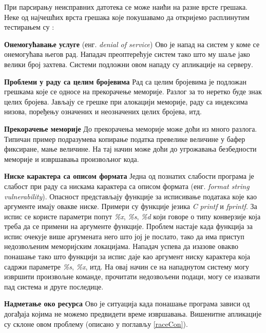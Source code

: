 \documentclass[12pt,oneside]{memoir}
\begin{document}
При парсирању неисправних датотека се може наићи на разне врсте грешака. Неке од најчешћих врста грешака које покушавамо да откријемо расплинутим тестирањем су \cite{fuzzingBrute, fuzzing}:
\begin{description}
\item \textbf{Онемогућавање услуге} (енг. \textit{denial of service}) Ово је напад на систем у коме се онемогућава његов рад. Нападач преоптерећује систем тако што му шаље јако велики број захтева. Системи подложни овом нападу су апликације на серверу.   
\item \textbf{Проблеми у раду са целим бројевима} Рад са целим бројевима је подложан грешкама које се односе на прекорачење меморије. Разлог за то неретко буде знак целих бројева. Јављају се грешке при алокацији меморије, раду са индексима низова, поређењу означених и неозначених целих бројева, итд.
\item \textbf{Прекорачење меморије} До прекорачења меморије може доћи из много разлога. Типичан пример подразумева копирање податка превелике величине у бафер фиксиране, мање величине. На тај начин може доћи до угрожавања безбедности меморије и извршавања произвољног кода.
\item \textbf{Ниске карактера са описом формата} Једна од познатих слабости програма је слабост при раду са нискама карактера са описом формата  (енг. \textit{format string vulnerability}). Опасност представљају функције за исписивање података које као аргументе имају овакве ниске. Примери су функције језика \textit{C} \textit{printf} и \textit{fprintf}. За испис се користе параметри попут \textit{\%x}, \textit{\%s}, \textit{\%d} који говоре о типу конверзије која треба да се примени на аргументе функције. Проблем настаје када функција за испис очекује више аргумената него што јој је послато, тако да има приступ недозвољеним меморијским локацијама. Нападач успева да изазове овакво понашање тако што функцији за испис даје као аргумент ниску карактера која садржи параметре \textit{\%s}, \textit{\%x}, итд. На овај начин се на нападнутом систему могу извршити произвољне команде, прочитати недозвољени подаци, могу се изазвати пад система и друге последице. 
\item \textbf{Надметање око ресурса} Ово је ситуација када понашање програма зависи од догађаја којима не можемо предвидети време извршавања. Вишенитне апликације су склоне овом проблему (описано у поглављу \ref{raceCon}).
\end{description}
\end{document}
